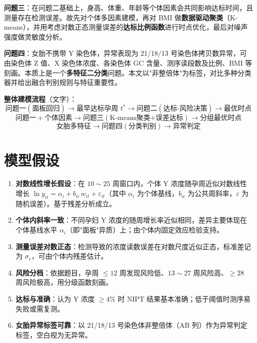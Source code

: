 \documentclass[12pt,a4paper]{article}
\begin{document}
\textbf{问题三}：在问题二基础上，身高、体重、年龄等个体因素会共同影响达标时间，且测量存在检测误差。故先对个体多因素建模，再对 BMI 做\textbf{数据驱动聚类}（K-means），并用考虑对数正态测量误差的\textbf{达标比例函数}进行时点优化，最后对噪声强度做灵敏度分析。

\textbf{问题四}：女胎不携带 Y 染色体，异常表现为 21/18/13 号染色体拷贝数异常，可由染色体 Z 值、X 染色体浓度、各染色体 GC 含量、测序读段数及比例、BMI 等刻画。本质上是一个\textbf{多特征二分类}问题。本文以"非整倍体"为标签，对比多种分类器并给出融合判别规则与特征重要性。

\vspace{0.3em}
\textbf{整体建模流程}（文字）：
\[
\text{问题一}(\text{面板回归})\to \text{最早达标孕周 }t^*\to \text{问题二}(\text{达标-风险决策})\to \text{最优时点}
\]
\[
\text{问题一}+\text{个体因素}\to \text{问题三}(\text{K-means聚类+误差达标})\to \text{分组最优时点}
\]
\[
\text{女胎多特征}\to \text{问题四}(\text{分类判别})\to \text{异常判定}
\]

\section{模型假设}
\begin{enumerate}
\item \textbf{对数线性增长假设}：在 $10\sim25$ 周窗口内，个体 Y 浓度随孕周近似对数线性增长 $\ln y_{it}=\alpha_i+b_w\,w_{it}+\varepsilon_{it}$（其中 $\alpha_i$ 为个体基线，$b_w$ 为公共周斜率，$\varepsilon$ 为随机误差）。基于残差分析成立。
\item \textbf{个体内斜率一致}：不同孕妇 Y 浓度的随周增长率近似相同，差异主要体现在个体基线水平 $\alpha_i$（即"面板"异质）上；由个体内固定效应检验支持。
\item \textbf{测量误差对数正态}：检测导致的浓度读数误差在对数尺度近似正态，标准差记为 $\sigma_e$，可由个体内残差估计。
\item \textbf{风险分档}：依据题目，孕周 $\leq12$ 周发现风险低、$13\sim27$ 周风险高、$\geq28$ 周风险极高，用分级函数刻画。
\item \textbf{达标与准确}：认为 Y 浓度 $\geq4\%$ 时 NIPT 结果基本准确；低于阈值时测序易失败或需复测。
\item \textbf{女胎异常标签可靠}：以 21/18/13 号染色体非整倍体（AB 列）作为异常判定标签，空白视为无异常。
\end{enumerate}

\end{document}
